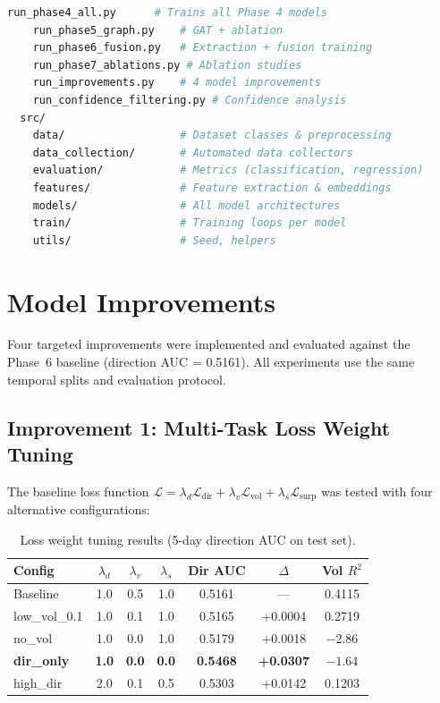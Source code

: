 \documentclass[12pt,a4paper]{article}
\begin{document}
\begin{lstlisting}[language=bash,caption={Final project directory layout}]
    run_phase4_all.py      # Trains all Phase 4 models
    run_phase5_graph.py    # GAT + ablation
    run_phase6_fusion.py   # Extraction + fusion training
    run_phase7_ablations.py # Ablation studies
    run_improvements.py    # 4 model improvements
    run_confidence_filtering.py # Confidence analysis
  src/
    data/                  # Dataset classes & preprocessing
    data_collection/       # Automated data collectors
    evaluation/            # Metrics (classification, regression)
    features/              # Feature extraction & embeddings
    models/                # All model architectures
    train/                 # Training loops per model
    utils/                 # Seed, helpers
\end{lstlisting}

\section{Model Improvements}
\label{sec:improvements}

Four targeted improvements were implemented and evaluated against the Phase~6 baseline (direction AUC = 0.5161). All experiments use the same temporal splits and evaluation protocol.

\subsection{Improvement 1: Multi-Task Loss Weight Tuning}

The baseline loss function $\mathcal{L} = \lambda_d \mathcal{L}_{\text{dir}} + \lambda_v \mathcal{L}_{\text{vol}} + \lambda_s \mathcal{L}_{\text{surp}}$ was tested with four alternative configurations:

\begin{table}[H]
\centering
\caption{Loss weight tuning results (5-day direction AUC on test set).}
\begin{tabular}{lcccccc}
\toprule
\textbf{Config} & $\lambda_d$ & $\lambda_v$ & $\lambda_s$ & \textbf{Dir AUC} & \textbf{$\Delta$} & \textbf{Vol $R^2$} \\
\midrule
Baseline       & 1.0 & 0.5 & 1.0 & 0.5161 & ---     & 0.4115 \\
low\_vol\_0.1  & 1.0 & 0.1 & 1.0 & 0.5165 & +0.0004 & 0.2719 \\
no\_vol        & 1.0 & 0.0 & 1.0 & 0.5179 & +0.0018 & $-2.86$ \\
\textbf{dir\_only} & \textbf{1.0} & \textbf{0.0} & \textbf{0.0} & \textbf{0.5468} & \textbf{+0.0307} & $-1.64$ \\
high\_dir      & 2.0 & 0.1 & 0.5 & 0.5303 & +0.0142 & 0.1203 \\
\bottomrule
\end{tabular}
\end{table}
\end{document}
